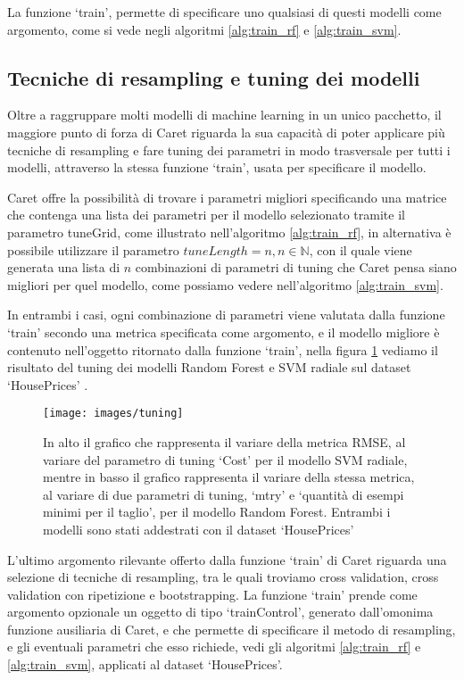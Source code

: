 \documentclass[12pt]{article}
\begin{document}
La funzione ‘train’, permette di specificare uno qualsiasi di questi modelli come argomento, come si vede negli algoritmi \ref{alg:train_rf} e \ref{alg:train_svm}.

\subsection{Tecniche di resampling e tuning dei modelli}
Oltre a raggruppare molti modelli di machine learning in un unico pacchetto, il maggiore punto di forza di Caret riguarda la sua capacità di poter  
applicare più tecniche di resampling e fare tuning dei parametri in modo trasversale per tutti i modelli, attraverso la stessa funzione ‘train’, usata per specificare il modello.

\bigskip
Caret offre la possibilità di trovare i parametri migliori specificando una matrice che contenga una lista dei parametri per il modello selezionato tramite il parametro tuneGrid, come illustrato nell'algoritmo \ref{alg:train_rf}, 
in alternativa è possibile utilizzare il parametro $tuneLength=n, n \in \mathbb{N}$, con il quale viene generata una lista di $n$ combinazioni di parametri di tuning che Caret pensa siano migliori per quel modello, 
come possiamo vedere nell'algoritmo \ref{alg:train_svm}. 

In entrambi i casi, ogni combinazione di parametri viene valutata dalla funzione ‘train’ secondo una metrica specificata come argomento, e il modello migliore è contenuto nell'oggetto ritornato dalla funzione ‘train’, 
nella figura \ref{img:tuning} vediamo il risultato del tuning dei modelli Random Forest e SVM radiale sul dataset ‘HousePrices’ \cite{cit:houseprices}.

 \begin{figure}[H]
    \centering
    \texttt{[image: images/tuning]}
    \caption{In alto il grafico che rappresenta il variare della metrica RMSE, al variare del parametro di tuning ‘Cost’ per il modello SVM radiale, mentre in basso 
    il grafico rappresenta il variare della stessa metrica, al variare di due parametri di tuning, ‘mtry’ e ‘quantità di esempi minimi per il taglio’, per il modello Random Forest. 
    Entrambi i modelli sono stati addestrati con il dataset ‘HousePrices’}
    \label{img:tuning}
\end{figure}

L'ultimo argomento rilevante offerto dalla funzione ‘train’ di Caret riguarda una selezione di tecniche di resampling, tra le quali troviamo cross validation, cross validation con ripetizione e bootstrapping. 
La funzione ‘train’ prende come argomento opzionale un oggetto di tipo ‘trainControl’, generato dall'omonima funzione ausiliaria di Caret, e che permette di specificare il metodo di resampling, e gli eventuali parametri che esso richiede, 
vedi gli algoritmi \ref{alg:train_rf} e \ref{alg:train_svm}, applicati al dataset ‘HousePrices’.
\end{document}
